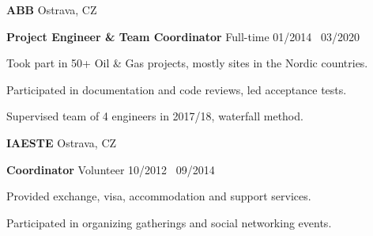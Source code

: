 
\vspace{1.0em}

\textsc{\textbf{ABB}}
\textsuperscript{\href{https://www.abb.com/}{\faExternalLink*}}
\hfill Ostrava, CZ

\textbf{Project Engineer \& Team Coordinator}
\enspace Full-time \hfill 01/2014 \textendash\ 03/2020

\vspace{0.3em}

\begin{ranglelist}
  \item Took part in 50+ Oil \& Gas projects, mostly sites in the Nordic countries.
  \item Participated in documentation and code reviews, led acceptance tests.
  \item Supervised team of 4 engineers in 2017/18, waterfall method.
\end{ranglelist}

\vspace{1.0em}

\textsc{\textbf{IAESTE}}
\textsuperscript{\href{https://www.iaeste.org/}{\faExternalLink*}}
\hfill Ostrava, CZ

\textbf{Coordinator}
\enspace Volunteer \hfill 10/2012 \textendash\ 09/2014

\vspace{0.3em}

\begin{ranglelist}
  \item Provided exchange, visa, accommodation and support services.
  \item Participated in organizing gatherings and social networking events.
\end{ranglelist}

\vspace{1.0em}

